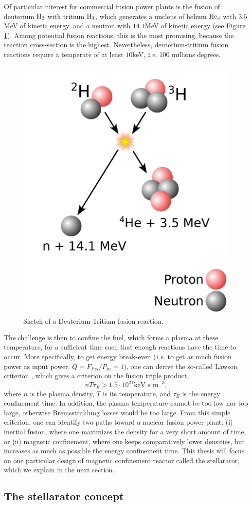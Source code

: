 \documentclass[my_thesis.tex]{subfiles}
\begin{document}
Of particular interest for commercial fusion power plants is the fusion of deuterium $\ce{H2}$ with tritium $\ce{H3}$, which generates a nucleus of helium $\ce{He4}$ with $3.5$MeV of kinetic energy, and a neutron with $14.1$MeV of kinetic energy (see Figure \ref{fig. dt fusion}). Among potential fusion reactions, this is the most promising, because the reaction cross-section is the highest. Nevertheless, deuterium-tritium fusion reactions require a temperate of at least $10$keV, \textit{i.e.} 100 millions degrees. 
\begin{figure}
    \centering
    \includegraphics[width=.5\linewidth]{images/introduction/DTFusion.png}
    \caption{Sketch of a Deuterium-Tritium fusion reaction.}
    \label{fig. dt fusion}
\end{figure}

The challenge is then to confine the fuel, which forms a plasma at these temperature, for a sufficient time such that enough reactions have the time to occur. More specifically, to get energy break-even (\textit{i.e.} to get as much fusion power as input power, $Q=F_{fus}/P_{in}=1$), one can derive the so-called Lawson criterion \citep{lawsonCriteriaPowerProducing1957}, which gives a criterion on the fusion triple product,
\begin{equation}
    nT\tau_E > 1.5\cdot 10^{21}\text{keV s m}^{-3}, 
\end{equation} 
where $n$ is the plasma density, $T$ is its temperature, and $\tau_E$ is the energy confinement time. In addition, the plasma temperature cannot be too low nor too large, otherwise Bremsstrahlung losses would be too large. From this simple criterion, one can identify two paths toward a nuclear fusion power plant: (i) inertial fusion, where one maximizes the density for a very short amount of time, or (ii) magnetic confinement, where one keeps comparatively lower densities, but increases as much as possible the energy confinement time. This thesis will focus on one particular design of magnetic confinement reactor called the stellarator, which we explain in the next section.


\subsection{The stellarator concept}
\end{document}
